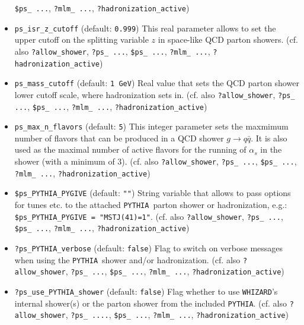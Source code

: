 \documentclass[12pt]{book}
\newcommand{\ttt}[1]{\texttt{#1}}
\newcommand{\whizard}{\texttt{WHIZARD}}
\newcommand{\pythia}{\texttt{PYTHIA}}
\begin{document}
\begin{itemize}
\ttt{\$ps\_ ...}, \ttt{?mlm\_ ...}, \ttt{?hadronization\_active})  
\item
\ttt{ps\_isr\_z\_cutoff} \qquad (default: \ttt{0.999}) \newline
This real parameter allows to set the upper cutoff on the splitting
variable $z$ in space-like QCD parton showers. (cf. also
\ttt{?allow\_shower}, \ttt{?ps\_   ...}, \ttt{\$ps\_ ...}, \ttt{?mlm\_
...}, \ttt{?hadronization\_active})    
\item
\ttt{ps\_mass\_cutoff} \qquad (default: \ttt{1 GeV}) \newline
Real value that sets the QCD parton shower lower cutoff scale, where
hadronization sets in. (cf. also \ttt{?allow\_shower}, \ttt{?ps\_
...}, \ttt{\$ps\_ ...}, \ttt{?mlm\_ ...},
\ttt{?hadronization\_active})  
\item
\ttt{ps\_max\_n\_flavors} \qquad (default: \ttt{5}) \newline
This integer parameter sets the maxmimum number of flavors that can be
produced in a QCD shower $g\to q\bar q$. It is also used as the
maximal number of active flavors for the running of $\alpha_s$ in the
shower (with a minimum of 3). (cf. also \ttt{?allow\_shower}, \ttt{?ps\_
...}, \ttt{\$ps\_ ...}, \ttt{?mlm\_ ...},
\ttt{?hadronization\_active})
\item
\ttt{\$ps\_PYTHIA\_PYGIVE} \qquad (default: \ttt{""}) \newline
String variable that allows to pass options for tunes etc. to the
attached \pythia\ parton shower or hadronization, e.g.:
\ttt{\$ps\_PYTHIA\_PYGIVE = "MSTJ(41)=1"}.  (cf. also
\newline \ttt{?allow\_shower}, \ttt{?ps\_ ...}, \ttt{\$ps\_ ...}, \ttt{?mlm\_
...}, \ttt{?hadronization\_active})
\item
\ttt{?ps\_PYTHIA\_verbose} \qquad (default: \ttt{false}) \newline
Flag to switch on verbose messages when using the \pythia\ shower
and/or hadronization. (cf. also \ttt{?allow\_shower}, \ttt{?ps\_
...}, \ttt{\$ps\_ ...}, \ttt{?mlm\_ ...}, \ttt{?hadronization\_active})  
\item
\ttt{?ps\_use\_PYTHIA\_shower} \qquad (default: \ttt{false}) \newline
Flag whether to use \whizard's internal shower(s) or the parton
shower from the included \pythia. (cf. also \ttt{?allow\_shower}, \ttt{?ps\_
  ....}, \ttt{\$ps\_ ...}, \ttt{?mlm\_ ...}, \newline
\ttt{?hadronization\_active}) 

\end{itemize}
\end{document}
